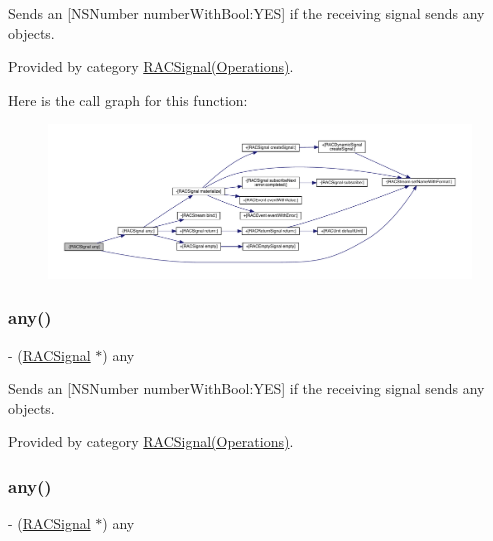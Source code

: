 Sends an \mbox{[}N\+S\+Number number\+With\+Bool\+:Y\+ES\mbox{]} if the receiving signal sends any objects. 

Provided by category \mbox{\hyperlink{category_r_a_c_signal_07_operations_08_af64359cf92ab95039f48270a71446e08}{R\+A\+C\+Signal(\+Operations)}}.

Here is the call graph for this function\+:\nopagebreak
\begin{figure}[H]
\begin{center}
\leavevmode
\includegraphics[width=350pt]{interface_r_a_c_signal_af64359cf92ab95039f48270a71446e08_cgraph}
\end{center}
\end{figure}
\mbox{\label{interface_r_a_c_signal_af64359cf92ab95039f48270a71446e08}} 
\subsubsection{\texorpdfstring{any()}{any()}\hspace{0.1cm}{\footnotesize\ttfamily [2/3]}}
{\footnotesize\ttfamily -\/ (\mbox{\hyperlink{interface_r_a_c_signal}{R\+A\+C\+Signal}} $\ast$) any \begin{DoxyParamCaption}{ }\end{DoxyParamCaption}}

Sends an \mbox{[}N\+S\+Number number\+With\+Bool\+:Y\+ES\mbox{]} if the receiving signal sends any objects. 

Provided by category \mbox{\hyperlink{category_r_a_c_signal_07_operations_08_af64359cf92ab95039f48270a71446e08}{R\+A\+C\+Signal(\+Operations)}}.

\mbox{\label{interface_r_a_c_signal_af64359cf92ab95039f48270a71446e08}} 
\subsubsection{\texorpdfstring{any()}{any()}\hspace{0.1cm}{\footnotesize\ttfamily [3/3]}}
{\footnotesize\ttfamily -\/ (\mbox{\hyperlink{interface_r_a_c_signal}{R\+A\+C\+Signal}} $\ast$) any \begin{DoxyParamCaption}{ }\end{DoxyParamCaption}}

